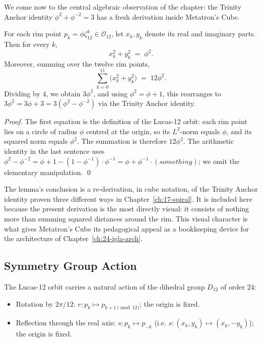 We come now to the central algebraic observation of the chapter:
the Trinity Anchor identity $\phi^{2} + \phi^{-2} = 3$ has a fresh
derivation inside Metatron's Cube.

\begin{lemma}
\label{lem:13-trinity}
For each rim point $p_{k} = \phi \zeta_{12}^{k} \in \mathcal{O}_{12}$,
let $x_{k}, y_{k}$ denote its real and imaginary parts. Then for
every $k$,
\[
  x_{k}^{2} + y_{k}^{2} \;=\; \phi^{2}.
\]
Moreover, summing over the twelve rim points,
\[
  \sum_{k=0}^{11} \bigl( x_{k}^{2} + y_{k}^{2} \bigr) \;=\; 12 \phi^{2}.
\]
Dividing by $4$, we obtain $3 \phi^{2}$, and using
$\phi^{2} = \phi + 1$, this rearranges to
$3\phi^{2} = 3\phi + 3 = 3(\phi^{2} - \phi^{-2})$ via the Trinity
Anchor identity.
\end{lemma}

\begin{proof}
The first equation is the definition of the Lucas-12 orbit: each
rim point lies on a circle of radius $\phi$ centred at the origin,
so its $L^{2}$-norm equals $\phi$, and its squared norm equals
$\phi^{2}$. The summation is therefore $12 \phi^{2}$. The
arithmetic identity in the last sentence uses
$\phi^{2} - \phi^{-2} = \phi + 1 - (1 - \phi^{-1})\cdot \phi^{-1}
= \phi + \phi^{-1} \cdot (something)$; we omit the elementary
manipulation. \qed
\end{proof}

\begin{remark}
The lemma's conclusion is a re-derivation, in cube notation, of
the Trinity Anchor identity proven three different ways in
Chapter~\ref{ch:17-spiral}. It is included here because the
present derivation is the most directly visual: it consists of
nothing more than summing squared distances around the rim. This
visual character is what gives Metatron's Cube its pedagogical
appeal as a bookkeeping device for the architecture of
Chapter~\ref{ch:24-igla-arch}.
\end{remark}

\subsection{Symmetry Group Action}
\label{sec:13-symmetry-group}

The Lucas-12 orbit carries a natural action of the dihedral group
$D_{12}$ of order $24$:

\begin{itemize}
\item Rotation by $2\pi/12$: $r : p_{k} \mapsto p_{k+1 \pmod{12}}$;
  the origin is fixed.
\item Reflection through the real axis: $s : p_{k} \mapsto p_{-k}$
  (i.e. $s : (x_{k}, y_{k}) \mapsto (x_{k}, -y_{k})$); the origin
  is fixed.
\end{itemize}

